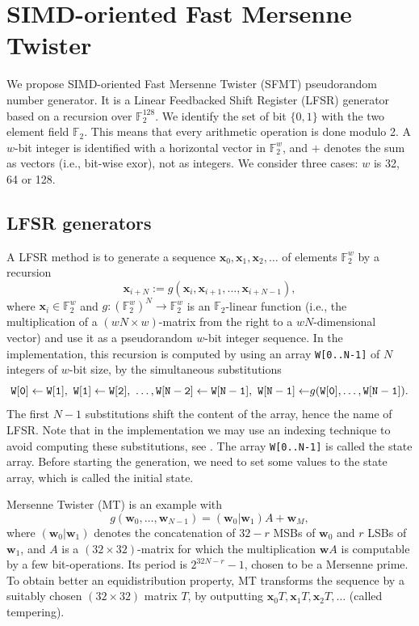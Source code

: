 \documentclass[acmnow]{acmtrans2m}
\def\F2{{\mathbb F}_2}
\def\bx{{{\mathbf x}}}
\def\bw{{{\mathbf w}}}
\begin{document}
\section{SIMD-oriented Fast Mersenne Twister}\label{sec:jump}

We propose SIMD-oriented Fast Mersenne Twister (SFMT) 
pseudorandom number generator. It is a
Linear Feedbacked Shift Register (LFSR) generator based
on a recursion over $\F2^{128}$.
We identify
the set of bit $\{0,1\}$
with the two element field $\F2$. This means that
every arithmetic operation is done modulo 2. 
A $w$-bit integer is identified with 
a horizontal vector in $\F2^{w}$, and 
$+$ denotes the sum as vectors (i.e., 
bit-wise exor), not as integers.
We consider three cases: $w$ is 32, 64 or 128.

\subsection{LFSR generators}
A LFSR method is to generate
a sequence $\bx_0, \bx_1, \bx_2, \ldots$
of elements $\F2^{w}$ by a recursion
\begin{equation}\label{eq:recursion}
\bx_{i+N}:=g(\bx_i, \bx_{i+1}, \ldots, \bx_{i+N-1}),
\end{equation}
where $\bx_i \in \F2^{w}$ and 
$g:(\F2^{w})^N \to \F2^{w}$ is an $\F2$-linear function
(i.e., the multiplication of a $(wN \times w)$-matrix 
from the right to a $wN$-dimensional vector)
and use it as a pseudorandom $w$-bit integer sequence.
In the implementation, this recursion is computed
by using an array {\tt W[0..N-1]} of $N$ integers of $w$-bit size,
by the simultaneous substitutions
$$
{\tt
W[0] \leftarrow W[1],\ 
W[1] \leftarrow W[2],\  \ldots,
W[N-2] \leftarrow W[N-1],\  
W[N-1] \leftarrow} g({\tt W[0]},\ldots,{\tt W[N-1]}). 
$$
The first $N-1$ substitutions shift the content of 
the array, hence the name of LFSR. 
Note that in the implementation we may use 
an indexing technique to avoid
computing these substitutions, see \cite[P.28 Algorithm A]{knuth:bible}.
The array {\tt W[0..N-1]} is called the state array.
Before starting the generation, we need to 
set some values to the state array, 
which is called the initial state. 

Mersenne Twister (MT) \cite{MT}
is an example with
$$
g(\bw_0,\ldots,\bw_{N-1})=(\bw_0|\bw_1)A + \bw_M,
$$
where $(\bw_0|\bw_1)$ denotes
the concatenation of 
$32-r$ MSBs of $\bw_0$ and $r$ LSBs of $\bw_1$,
and $A$ is a $(32\times 32)$-matrix 
for which the multiplication $\bw A$ is computable 
by a few bit-operations.
Its period is $2^{32N-r}-1$, chosen to be a Mersenne prime.
To obtain better an equidistribution property, 
MT transforms the sequence by
a suitably chosen $(32\times 32)$ matrix $T$,
by outputting
$\bx_0T , \bx_1T, \bx_2T, \ldots$
(called tempering).
\end{document}
